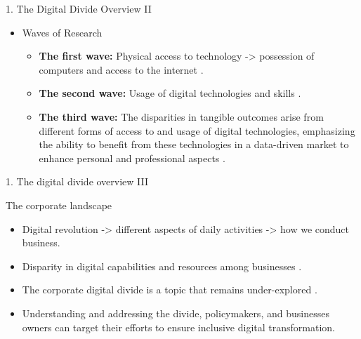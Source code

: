 \documentclass[
  ignorenonframetext,
]{beamer}
\providecommand{\tightlist}{%
  \setlength{\itemsep}{0pt}\setlength{\parskip}{0pt}}
\begin{document}
\begin{frame}{1. The Digital Divide Overview II}
\protect\hypertarget{the-digital-divide-overview-ii}{}
\begin{itemize}
\tightlist
\item
  Waves of Research

  \begin{itemize}
  \item
    \textbf{The first wave:} Physical access to technology
    -\textgreater{} possession of computers and access to the internet
    \citep{norris2001, james2002, castells2003}.
  \item
    \textbf{The second wave:} Usage of digital technologies and skills
    \citep{hargittai2002b, vandijk2005b, vandijk2006c, vandeursen2011c}.
  \item
    \textbf{The third wave:} The disparities in tangible outcomes arise
    from different forms of access to and usage of digital technologies,
    emphasizing the ability to benefit from these technologies in a
    data-driven market to enhance personal and professional aspects
    \citep{ragnedda2017, vandeursen2015a}.
  \end{itemize}
\end{itemize}
\end{frame}

\begin{frame}{1. The digital divide overview III}
\protect\hypertarget{the-digital-divide-overview-iii}{}
\begin{block}{The corporate landscape}
\protect\hypertarget{the-corporate-landscape}{}
\begin{itemize}
\tightlist
\item
  Digital revolution -\textgreater{} different aspects of daily
  activities -\textgreater{} how we conduct business.
\item
  Disparity in digital capabilities and resources among businesses
  \citep{shakina2021}.
\item
  The corporate digital divide is a topic that remains under-explored
  \citep{pejicbach2013, shakina2021}.
\item
  Understanding and addressing the divide, policymakers, and businesses
  owners can target their efforts to ensure inclusive digital
  transformation.
\end{itemize}
\end{block}
\end{frame}
\end{document}
